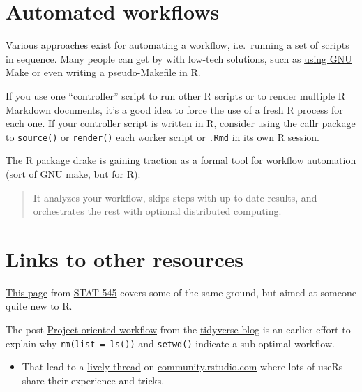 \documentclass[
  letterpaper,
]{book}
\providecommand{\tightlist}{%
  \setlength{\itemsep}{0pt}\setlength{\parskip}{0pt}}\usepackage{longtable,booktabs,array}
\begin{document}
\hypertarget{automated-workflows}{%
\section*{Automated workflows}\label{automated-workflows}}

Various approaches exist for automating a workflow, i.e.~running a set
of scripts in sequence. Many people can get by with low-tech solutions,
such as \href{http://kbroman.org/minimal_make/}{using GNU Make} or even
writing a pseudo-Makefile in R.

If you use one ``controller'' script to run other R scripts or to render
multiple R Markdown documents, it's a good idea to force the use of a
fresh R process for each one. If your controller script is written in R,
consider using the \href{https://callr.r-lib.org}{callr package} to
\texttt{source()} or \texttt{render()} each worker script or
\texttt{.Rmd} in its own R session.

The R package \href{https://ropenscilabs.github.io/drake-manual/}{drake}
is gaining traction as a formal tool for workflow automation (sort of
GNU make, but for R):

\begin{quote}
It analyzes your workflow, skips steps with up-to-date results, and
orchestrates the rest with optional distributed computing.
\end{quote}

\hypertarget{links-to-other-resources}{%
\section*{Links to other resources}\label{links-to-other-resources}}

\href{https://stat545.com/r-basics.html}{This page} from
\href{https://stat545.com}{STAT 545} covers some of the same ground, but
aimed at someone quite new to R.

The post
\href{https://www.tidyverse.org/articles/2017/12/workflow-vs-script/}{Project-oriented
workflow} from the \href{https://www.tidyverse.org/articles/}{tidyverse
blog} is an earlier effort to explain why \texttt{rm(list\ =\ ls())} and
\texttt{setwd()} indicate a sub-optimal workflow.

\begin{itemize}
\tightlist
\item
  That lead to a
  \href{https://community.rstudio.com/t/project-oriented-workflow-setwd-rm-list-ls-and-computer-fires/3549/2}{lively
  thread} on \href{https://community.rstudio.com}{community.rstudio.com}
  where lots of useRs share their experience and tricks.
\end{itemize}
\end{document}
